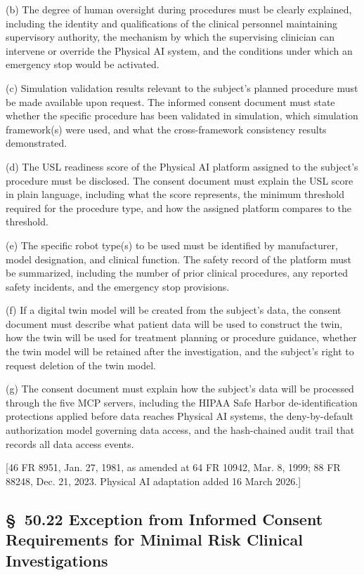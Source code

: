 \documentclass[11pt]{article}
\begin{document}
(b) The degree of human oversight during procedures must be clearly explained, including the identity and qualifications of the clinical personnel maintaining supervisory authority, the mechanism by which the supervising clinician can intervene or override the Physical AI system, and the conditions under which an emergency stop would be activated.

(c) Simulation validation results relevant to the subject's planned procedure must be made available upon request. The informed consent document must state whether the specific procedure has been validated in simulation, which simulation framework(s) were used, and what the cross-framework consistency results demonstrated.

(d) The USL readiness score of the Physical AI platform assigned to the subject's procedure must be disclosed. The consent document must explain the USL score in plain language, including what the score represents, the minimum threshold required for the procedure type, and how the assigned platform compares to the threshold.

(e) The specific robot type(s) to be used must be identified by manufacturer, model designation, and clinical function. The safety record of the platform must be summarized, including the number of prior clinical procedures, any reported safety incidents, and the emergency stop provisions.

(f) If a digital twin model will be created from the subject's data, the consent document must describe what patient data will be used to construct the twin, how the twin will be used for treatment planning or procedure guidance, whether the twin model will be retained after the investigation, and the subject's right to request deletion of the twin model.

(g) The consent document must explain how the subject's data will be processed through the five MCP servers, including the HIPAA Safe Harbor de-identification protections applied before data reaches Physical AI systems, the deny-by-default authorization model governing data access, and the hash-chained audit trail that records all data access events.

[46 FR 8951, Jan. 27, 1981, as amended at 64 FR 10942, Mar. 8, 1999; 88 FR 88248, Dec. 21, 2023. Physical AI adaptation added 16 March 2026.]

\subsection{\S~50.22 Exception from Informed Consent Requirements for Minimal Risk Clinical Investigations}
\end{document}
